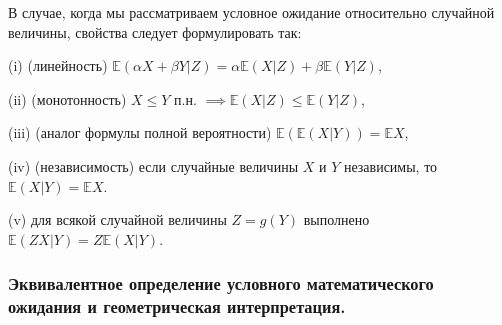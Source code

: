 \begin{theorem}
	В случае, когда мы рассматриваем условное ожидание относительно случайной величины, свойства следует формулировать так:
	
	(i) (линейность) $\mathbb{E}(\alpha X + \beta Y |Z) = \alpha\mathbb{E}(X|Z) + \beta\mathbb{E}(Y | Z)$,
	
	(ii) (монотонность) $X \leqslant Y$ п.н. $\implies \mathbb{E}(X|Z) \leqslant \mathbb{E}(Y|Z)$,
	
	(iii) (аналог формулы полной вероятности) $\mathbb{E}(\mathbb{E}(X|Y)) = \mathbb{E}X$,
	
	(iv) (независимость) если случайные величины $X$ и $Y$ независимы, то $\mathbb{E}(X|Y) = \mathbb{E}X$.
	
	(v) для всякой случайной величины $Z = g(Y)$ выполнено $\mathbb{E}(ZX|Y ) = Z\mathbb{E}(X|Y )$.
\end{theorem}

\subsubsection{Эквивалентное определение условного математического ожидания и геометрическая интерпретация.}